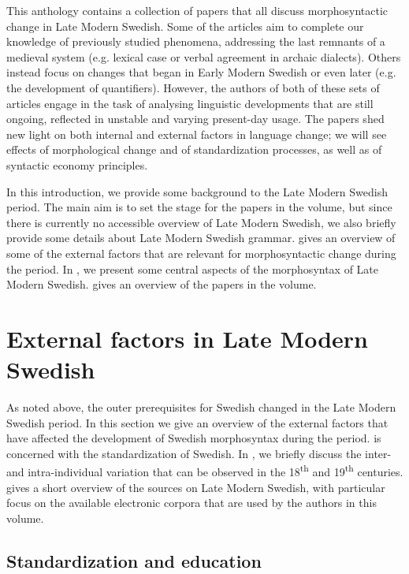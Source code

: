 \documentclass[output=paper]{langscibook}
\begin{document}
This anthology contains a collection of papers that all discuss morphosyntactic change in Late Modern Swedish. Some of the articles aim to complete our knowledge of previously studied phenomena, addressing the last remnants of a medieval system (e.g. lexical case or verbal agreement in archaic dialects). Others instead focus on changes that began in Early Modern Swedish or even later (e.g. the development of quantifiers). However, the authors of both of these sets of articles engage in the task of analysing linguistic developments that are still ongoing, reflected in unstable and varying present-day usage. The papers shed new light on both internal and external factors in language change; we will see effects of morphological change and of standardization processes, as well as of syntactic economy principles.



In this introduction, we provide some background to the Late Modern Swedish period. The main aim is to set the stage for the papers in the volume, but since there is currently no accessible overview of Late Modern Swedish, we also briefly provide some details about Late Modern Swedish grammar.  gives an overview of some of the external factors that are relevant for morphosyntactic change during the period. In , we present some central aspects of the morphosyntax of Late Modern Swedish.  gives an overview of the papers in the volume.


\section{External factors in Late Modern Swedish }\label{sec:intro:2}


As noted above, the outer prerequisites for Swedish changed in the Late Modern Swedish period. In this section we give an overview of the external factors that have affected the development of Swedish morphosyntax during the period.  is concerned with the standardization of Swedish. In , we briefly discuss the inter- and intra-individual variation that can be observed in the 18\textsuperscript{th} and 19\textsuperscript{th} centuries.  gives a short overview of the sources on Late Modern Swedish, with particular focus on the available electronic corpora that are used by the authors in this volume.


\subsection{Standardization and education}\label{sec:intro:2.1}
\end{document}

